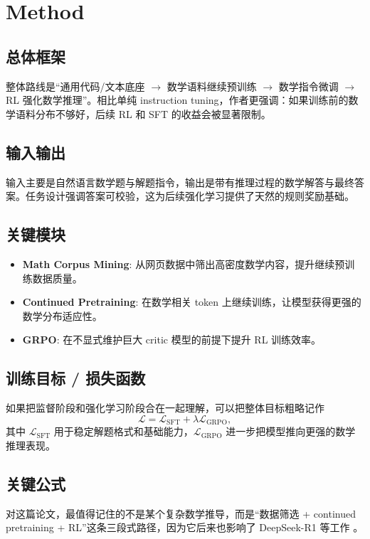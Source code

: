 \documentclass[UTF8,fontset=fandol,zihao=-4]{ctexart}
\begin{document}
\section{Method}

\subsection{总体框架}
整体路线是“通用代码/文本底座 $\rightarrow$ 数学语料继续预训练 $\rightarrow$ 数学指令微调 $\rightarrow$ RL 强化数学推理”。相比单纯 instruction tuning，作者更强调：如果训练前的数学语料分布不够好，后续 RL 和 SFT 的收益会被显著限制。

\subsection{输入输出}
输入主要是自然语言数学题与解题指令，输出是带有推理过程的数学解答与最终答案。任务设计强调答案可校验，这为后续强化学习提供了天然的规则奖励基础。

\subsection{关键模块}
\begin{itemize}
  \item \textbf{Math Corpus Mining}: 从网页数据中筛出高密度数学内容，提升继续预训练数据质量。
  \item \textbf{Continued Pretraining}: 在数学相关 token 上继续训练，让模型获得更强的数学分布适应性。
  \item \textbf{GRPO}: 在不显式维护巨大 critic 模型的前提下提升 RL 训练效率。
\end{itemize}

\subsection{训练目标 / 损失函数}
如果把监督阶段和强化学习阶段合在一起理解，可以把整体目标粗略记作
\begin{equation}
\mathcal{L}
= \mathcal{L}_{\mathrm{SFT}}
 + \lambda \mathcal{L}_{\mathrm{GRPO}},
\end{equation}
其中 $\mathcal{L}_{\mathrm{SFT}}$ 用于稳定解题格式和基础能力，$\mathcal{L}_{\mathrm{GRPO}}$ 进一步把模型推向更强的数学推理表现。

\subsection{关键公式}
对这篇论文，最值得记住的不是某个复杂数学推导，而是“数据筛选 + continued pretraining + RL”这条三段式路径，因为它后来也影响了 DeepSeek-R1 等工作 \cite{deepseekai2025r1}。
\end{document}
